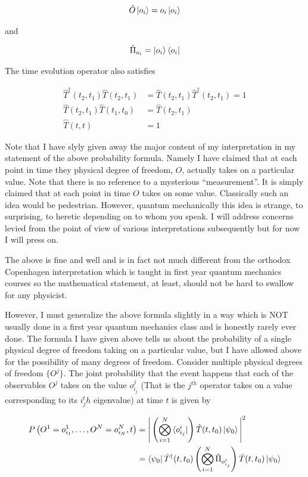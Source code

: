 \documentclass[12pt]{article}
\begin{document}
\begin{align}
\hat{O}\ket{o_i} = o_i\ket{o_i}
\end{align}

and

\begin{align}
\hat{\Pi}_{o_i} = \ket{o_i}\bra{o_i}
\end{align}

The time evolution operator also satisfies

\begin{align}
\hat{T}^{\dag}(t_2,t_1) \hat{T}(t_2,t_1) &= \hat{T}(t_2,t_1)\hat{T}^{\dag}(t_2,t_1) = 1\\
\hat{T}(t_2,t_1)\hat{T}(t_1,t_0) &= \hat{T}(t_2,t_1)\\
\hat{T}(t,t) &= 1
\end{align}

Note that I have slyly given away the major content of my interpretation in my statement of the above probability formula. Namely I have claimed that at each point in time they physical degree of freedom, $O$, actually takes on a particular value. Note that there is no reference to a mysterious ``measurement''. It is simply claimed that at each point in time $O$ takes on some value. Classically such an idea would be pedestrian. However, quantum mechanically this idea is strange, to surprising, to heretic depending on to whom you speak. I will address concerns levied from the point of view of various interpretations subsequently but for now I will press on.

The above is fine and well and is in fact not much different from the orthodox Copenhagen interpretation which is taught in first year quantum mechanics courses so the mathematical statement, at least, should not be hard to swallow for any physicist.

However, I must generalize the above formula slightly in a way which is NOT usually done in a first year quantum mechanics class and is honestly rarely ever done.
The formula I have given above tells us about the probability of a single physical degree of freedom taking on a particular value, but I have allowed above for the possibility of many degrees of freedom. Consider multiple physical degrees of freedom $\{O^j\}$. The joint probability that the event happens that each of the observables $O^j$ takes on the value $o^j_{i_j}$ (That is the $j^{th}$ operator takes on a value corresponding to its $i_j^th$ eigenvalue) at time $t$ is given by

\begin{align}
P\left(O^1=o^1_{i_1},\ldots ,O^N=o^N_{i_N},t\right) &= \Bigg|\left(\bigotimes_{i=1}^N \bra{o^i_{i_j}}\right) \hat{T}(t,t_0)\ket{\psi_0} \Bigg|^2\\
&= \Bra{\psi_0}\hat{T}^{\dag}(t,t_0)\left(\bigotimes_{i=1}^N \hat{\Pi}_{o^i_{i_j}} \right) \hat{T}(t,t_0)\ket{\psi_0}
\end{align}
\end{document}
